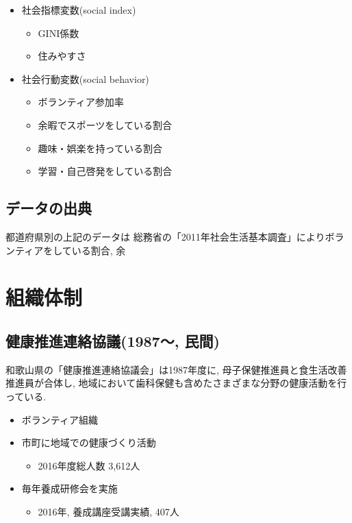 \begin{itemize} \setlength{\itemsep}{-0.5mm} \setlength{\parskip}{-0.5mm}
	\item 社会指標変数(social index)
	      \begin{itemize} \setlength{\itemsep}{-0.5mm} \setlength{\parskip}{-0.5mm}
		      \item 	GINI係数
		      \item 	住みやすさ　%
	      \end{itemize}
	\item 社会行動変数(social behavior)
	      \begin{itemize} \setlength{\itemsep}{-0.5mm} \setlength{\parskip}{-0.5mm}
		      \item 	ボランティア参加率
		      \item 	余暇でスポーツをしている割合
		      \item 	趣味・娯楽を持っている割合
		      \item 	学習・自己啓発をしている割合
	      \end{itemize}
\end{itemize}

\subsection{データの出典}
都道府県別の上記のデータは
総務省の「2011年社会生活基本調査」によりボランティアをしている割合, 余



\section{組織体制}
\subsection{健康推進連絡協議(1987〜, 民間)}
和歌山県の「健康推進連絡協議会」は1987年度に, 母子保健推進員と食生活改善推進員が合体し, 地域において歯科保健も含めたさまざまな分野の健康活動を行っている.
\begin{itemize} \setlength{\itemsep}{-0.5mm} \setlength{\parskip}{-0.5mm}

	\item  ボランティア組織
	\item  市町に地域での健康づくり活動
	      \begin{itemize} \setlength{\itemsep}{-0.5mm} \setlength{\parskip}{-0.5mm}
		      \item 2016年度総人数 3,612人
	      \end{itemize}
	\item  毎年養成研修会を実施
	      \begin{itemize} \setlength{\itemsep}{-0.5mm} \setlength{\parskip}{-0.5mm}
		      \item 2016年, 養成講座受講実績, 407人
	      \end{itemize}
\end{itemize}

